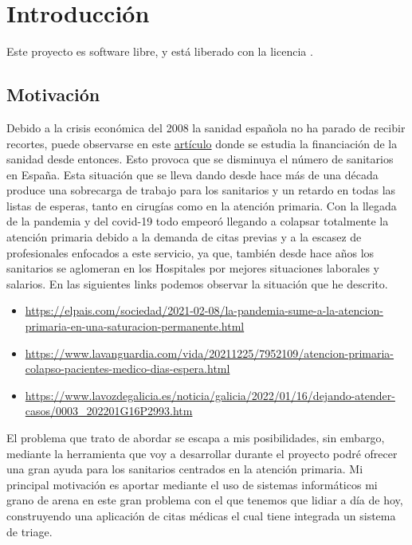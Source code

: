 \chapter{Introducción}

Este proyecto es software libre, y está liberado con la licencia \cite{gplv3}.

\section{Motivación}
Debido a la crisis económica del 2008 la sanidad española no ha parado de recibir recortes, puede observarse en este
\href{https://www.consalud.es/politica/decada-recortes-2009-2018-efectos-infrafinanciacion-sanidad_87083_102.html}{artículo} donde
se estudia la financiación de la sanidad desde entonces. Esto provoca que se disminuya el número de sanitarios en España.
Esta situación que se lleva dando desde hace más de una década produce una sobrecarga de trabajo para los sanitarios y un retardo
en todas las listas de esperas, tanto en cirugías como en la atención primaria.
Con la llegada de la pandemia y del covid-19 todo empeoró llegando a colapsar totalmente la atención primaria debido a la demanda
de citas previas y a la escasez de profesionales enfocados a este servicio, ya que, también desde hace años los sanitarios se aglomeran
en los Hospitales por mejores situaciones laborales y salarios. En las siguientes links podemos observar la situación que he descrito.
\begin{itemize}
    \item \url{https://elpais.com/sociedad/2021-02-08/la-pandemia-sume-a-la-atencion-primaria-en-una-saturacion-permanente.html}
    \item \url{https://www.lavanguardia.com/vida/20211225/7952109/atencion-primaria-colapso-pacientes-medico-dias-espera.html}
    \item \url{https://www.lavozdegalicia.es/noticia/galicia/2022/01/16/dejando-atender-casos/0003_202201G16P2993.htm}
\end{itemize}
El problema que trato de abordar se escapa a mis posibilidades, sin embargo, mediante la herramienta que voy a desarrollar
durante el proyecto podré ofrecer una gran ayuda para los sanitarios centrados en la atención primaria.
Mi principal motivación es aportar mediante el uso de sistemas informáticos mi grano de arena en este gran problema con el que
tenemos que lidiar a día de hoy, construyendo una aplicación de citas médicas el cual tiene integrada un sistema de triage.

